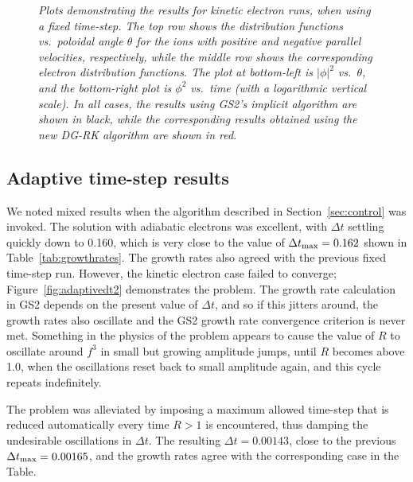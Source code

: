 \documentclass[10pt,a4paper]{article}
\begin{document}
\begin{figure}[!p]
  \begin{center}
  \end{center}
  \caption{\textit{Plots demonstrating the results for kinetic electron runs,
      when using a fixed time-step. The top row shows the distribution
      functions vs.\ poloidal angle $\theta$ for the ions with positive and
      negative parallel velocities, respectively, while the middle row shows
      the corresponding electron distribution functions. The plot at
      bottom-left is $|\phi|^2$ vs.\ $\theta$, and the bottom-right plot is
      $\phi^2$ vs.\ time (with a logarithmic vertical scale). In all cases,
      the results using GS2's implicit algorithm are shown in black, while the
      corresponding results obtained using the new DG-RK algorithm are shown
      in red.}
    \label{fig:ke_results} }
\end{figure}

\subsection{Adaptive time-step results}

We noted mixed results when the algorithm described in
Section~\ref{sec:control} was invoked. The solution with adiabatic electrons
was excellent, with $\Delta t$ settling quickly down to 0.160, which is very
close to the value of $\Delta t_{\mbox{\scriptsize max}} = 0.162$ shown in
Table~\ref{tab:growthrates}. The growth rates also agreed with the previous
fixed time-step run. However, the kinetic electron case failed to converge;
Figure~\ref{fig:adaptivedt2} demonstrates the problem. The growth rate
calculation in GS2 depends on the present value of $\Delta t$, and so if this
jitters around, the growth rates also oscillate and the GS2 growth rate
convergence criterion is never met. Something in the physics of the problem
appears to cause the value of $R$ to oscillate around $f^3$ in small but
growing amplitude jumps, until $R$ becomes above 1.0, when the oscillations
reset back to small amplitude again, and this cycle repeats indefinitely.

The problem was alleviated by imposing a maximum allowed time-step that is
reduced automatically every time $R > 1$ is encountered, thus damping the
undesirable oscillations in $\Delta t$. The resulting $\Delta t = 0.00143$,
close to the previous $\Delta t_{\mbox{\scriptsize max}} = 0.00165$, and the
growth rates agree with the corresponding case in the Table.
\end{document}
